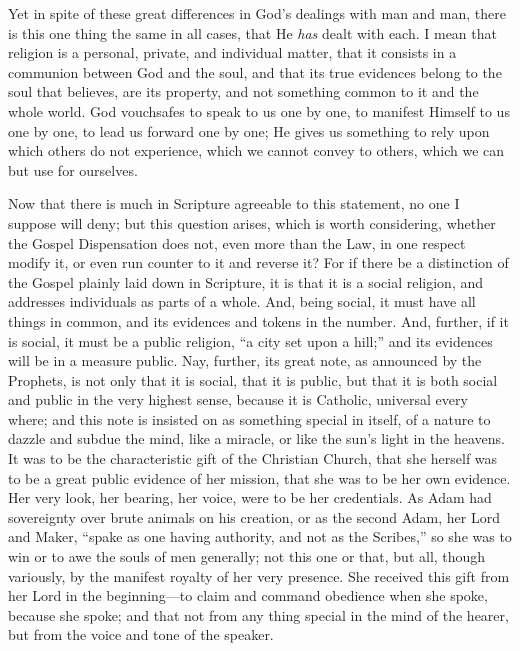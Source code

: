 Yet in spite of these great differences in God's dealings with man
and man, there is this one thing the same in all cases, that He \emph{has}
dealt with each. I mean that religion is a personal, private, and
individual matter, that it consists in a communion between God and the
soul, and that its true evidences belong to the soul that believes,
are its property, and not something common to it and the whole world.
God vouchsafes to speak to us one by one, to manifest Himself to us
one by one, to lead us forward one by one; He gives us something to
rely upon which others do not experience, which we cannot convey to
others, which we can but use for ourselves.

Now that there is much in Scripture agreeable to this statement, no
one I suppose will deny; but this question arises, which is worth
considering, whether the Gospel Dispensation does not, even more than
the Law, in one respect modify it, or even run counter to it and
reverse it? For if there be a distinction of the Gospel plainly laid
down in Scripture, it is that it is a social religion, and addresses
individuals as parts of a whole. And, being social, it must have all
things in common, and its evidences and tokens in the number. And,
further, if it is social, it must be a public religion, ``a city
set upon a hill;'' and its evidences will be in a measure public.
Nay, further, its great note, as announced by the Prophets, is not
only that it is social, that it is public, but that it is both social
and public in the very highest sense, because it is Catholic,
universal every where; and this note is insisted on as something
special in itself, of a nature to dazzle and subdue the mind, like a
miracle, or like the sun's light in the heavens. It was to be the
characteristic gift of the Christian Church, that she herself was to
be a great public evidence of her mission, that she was to be her own
evidence. Her very look, her bearing, her voice, were to be her
credentials. As Adam had sovereignty over brute animals on his
creation, or as the second Adam, her Lord and Maker, ``spake as
one having authority, and not as the Scribes,'' so she was to win
or to awe the souls of men generally; not this one or that, but all,
though variously, by the manifest royalty of her very presence. She
received this gift from her Lord in the beginning—to claim and
command obedience when she spoke, because she spoke; and that not from
any thing special in the mind of the hearer, but from the voice and
tone of the speaker.

